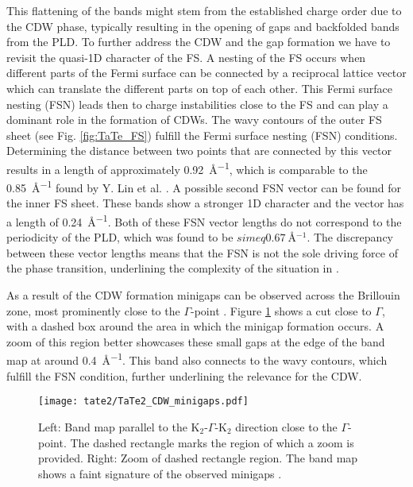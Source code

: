 This flattening of the bands might stem from the established charge order due to the CDW phase, typically resulting in the opening of gaps and backfolded bands from the PLD.
To further address the CDW and the gap formation we have to revisit the quasi-1D character of the FS.
A nesting of the FS occurs when different parts of the Fermi surface can be connected by a reciprocal lattice vector which can translate the different parts on top of each other.
This Fermi surface nesting (FSN) leads then to charge instabilities close to the FS and can play a dominant role in the formation of CDWs.
The wavy contours of the outer FS sheet (see Fig. \ref{fig:TaTe_FS}) fulfill the Fermi surface nesting (FSN) conditions.
Determining the distance between two points that are connected by this vector results in a length of approximately \qty{0.92}{\angstrom^{-1}}, which is comparable to the \qty{0.85}{\angstrom^{-1}} found by Y. Lin et al. \cite{lin_evidence_2022}.
A possible second FSN vector can be found for the inner FS sheet.
These bands show a stronger 1D character and the vector has a length of \qty{0.24}{\angstrom^{-1}}.
Both of these FSN vector lengths do not correspond to the periodicity of the PLD, which was found to be $simeq\qty{0.67}{\angstrom^{-1}}$.
The discrepancy between these vector lengths means that the FSN is not the sole driving force of the phase transition, underlining the complexity of the situation in .

As a result of the CDW formation minigaps can be observed across the Brillouin zone, most prominently close to the $\Gamma$-point \cite{lin_evidence_2022}.
Figure \ref{fig:TaTe_minigaps} shows a cut close to $\Gamma$, with a dashed box around the area in which the minigap formation occurs.
A zoom of this region better showcases these small gaps at the edge of the band map at around \qty{0.4}{\angstrom^{-1}}.
This band also connects to the wavy contours, which fulfill the FSN condition, further underlining the relevance for the CDW.

\begin{figure}[h!]
	\centering
	\texttt{[image: tate2/TaTe2\_CDW\_minigaps.pdf]}
	\caption{Left: Band map parallel to the K$_2$-$\Gamma$-K$_2$ direction close to the $\Gamma$-point. The dashed rectangle marks the region of which a zoom is provided. Right: Zoom of dashed rectangle region. The band map shows a faint signature of the observed minigaps \cite{lin_evidence_2022}.}
	\label{fig:TaTe_minigaps}
\end{figure}

